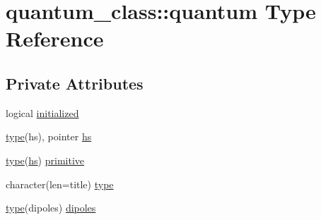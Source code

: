 \hypertarget{structquantum__class_1_1quantum}{\section{quantum\+\_\+class\+:\+:quantum Type Reference}
\label{structquantum__class_1_1quantum}
}
\subsection*{Private Attributes}
\begin{DoxyCompactItemize}
\item 
logical \hyperlink{structquantum__class_1_1quantum_a2900a58a734e38e761bd1d8c60b4b81f}{initialized}
\item 
\hyperlink{structquantum__class_1_1quantum_aa222a9bd02a7dd3f8b37cdbcd33a6d74}{type}(hs), pointer \hyperlink{structquantum__class_1_1quantum_a3fc38910e311bd6d449279fb2ac7288a}{hs}
\item 
\hyperlink{structquantum__class_1_1quantum_aa222a9bd02a7dd3f8b37cdbcd33a6d74}{type}(\hyperlink{structquantum__class_1_1quantum_a3fc38910e311bd6d449279fb2ac7288a}{hs}) \hyperlink{structquantum__class_1_1quantum_a285ebdf853c486f65ce55d6f45e65720}{primitive}
\item 
character(len=title) \hyperlink{structquantum__class_1_1quantum_aa222a9bd02a7dd3f8b37cdbcd33a6d74}{type}
\item 
\hyperlink{structquantum__class_1_1quantum_aa222a9bd02a7dd3f8b37cdbcd33a6d74}{type}(dipoles) \hyperlink{structquantum__class_1_1quantum_a987a3ad91de3703c7468ce14d9ba872c}{dipoles}
\end{DoxyCompactItemize}


